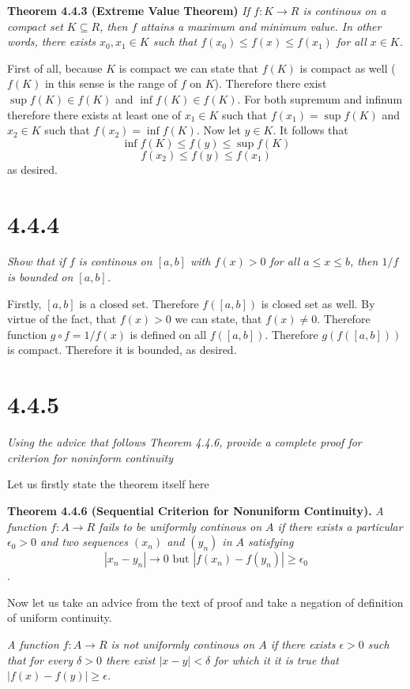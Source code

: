 \documentclass[11pt,oneside,titlepage]{book}
\begin{document}
\textbf{Theorem 4.4.3 (Extreme Value Theorem)}
\textit{If $f: K \to R$ is continous on a compact set $K \subseteq R$, then
  $f$ attains a maximum and minimum value. In other words, there exists
  $x_0, x_1 \in K$ such that $f(x_0) \leq f(x) \leq f(x_1)$ for all $x \in K$.}

First of all, because $K$ is compact we can state that $f(K)$ is compact
as well ($f(K)$ in this sense is the range of $f$ on $K$). Therefore
there exist $\sup f(K) \in f(K)$ and  $\inf f(K) \in f(K)$.
For both supremum and infinum therefore there exists at least one of
$x_1 \in K$ such that $f(x_1) = \sup f(K)$ and $x_2 \in K$
such that $f(x_2) = \inf f(K)$. Now let $y \in K$. It follows that
$$\inf f(K) \leq f(y) \leq \sup f(K) $$
$$f(x_2) \leq f(y) \leq f(x_1) $$
as desired.

\section*{4.4.4}
\textit{Show that if $f$ is continous on $[a, b]$ with $f(x) > 0$ for all
  $a \leq x \leq b$, then $1/f$ is bounded on $[a, b]$.}

Firstly, $[a, b]$ is a closed set. Therefore $f([a, b])$ is closed set as well.
By virtue of the fact, that $f(x) > 0$ we can state, that $f(x) \neq 0$.
Therefore function $g \circ f = 1/f(x)$ is defined on all $f([a, b])$.
Therefore $g(f([a, b]))$ is compact. Therefore it is bounded, as desired.

\section*{4.4.5}
\textit{Using the advice that follows Theorem 4.4.6, provide a complete
  proof for criterion for noninform continuity}

Let us firstly state the theorem itself here

\textbf{Theorem 4.4.6 (Sequential Criterion for Nonuniform Continuity).}
\textit{A function $f: A \to R$ fails to be uniformly continous on $A$ if
  there exists a particular $\epsilon_0 > 0$ and two sequences $(x_n)$ and
  $(y_n)$ in $A$ satisfying}
$$|x_n - y_n| \to 0 \text{ but } |f(x_n) - f(y_n)| \geq \epsilon_0$$.

Now let us take an advice from the text of proof and take a negation of
definition of uniform continuity.

\textit{A function $f:A \to R$ is not uniformly
 continous on $A$ if there exists $\epsilon > 0$ such that
 for every $\delta > 0$ there exist  $|x - y| < \delta$ for which it 
 it is true  that  $|f(x) - f(y)| \geq \epsilon$.}
\end{document}
